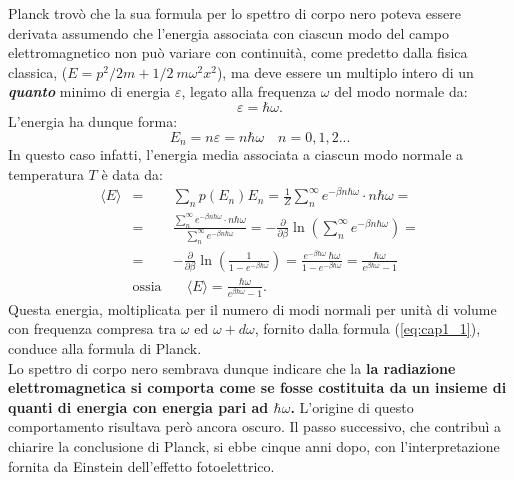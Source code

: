 \documentclass[a4paper,12pt,oneside]{book}
\begin{document}
Planck trovò che la sua formula  per lo spettro di corpo nero poteva essere derivata assumendo che l'energia associata con ciascun modo del campo elettromagnetico non può variare con continuità, come predetto dalla fisica classica, ($E= p^2/2m +1/2 \ m \omega ^2 x^2$), ma deve essere un multiplo intero di un \textbf{\textit{quanto}} minimo di energia $\varepsilon$, legato alla frequenza $\omega$ del modo normale da:
\begin{equation}
\varepsilon = \hbar \omega .
\end{equation}
L'energia ha dunque forma:
\begin{equation}
E_n = n\varepsilon = n \hbar \omega \quad n= 0,1,2...
\end{equation}
In questo caso infatti, l'energia media associata a ciascun modo normale a temperatura $T$ è data da:
\begin{eqnarray}
\langle E \rangle &=&\sum _n p(E_n) E_n =\frac{1}{Z}\sum _n ^{\infty} e^{-\beta n \hbar \omega} \cdot n\hbar \omega = \nonumber \\
&=&\frac{\sum _n ^{\infty} e^{-\beta n \hbar \omega} \cdot n\hbar \omega}{\sum _n ^{\infty} e^{-\beta n \hbar \omega}}= - \frac{\partial}{\partial \beta} \ln \left( \sum _n ^{\infty} e^{-\beta n \hbar \omega}\right)= \nonumber \\
&=&- \frac{\partial}{\partial \beta} \ln \left( \frac{1}{1- e^{-\beta \hbar \omega}}\right)=  \frac{e^{-\beta \hbar \omega}\ \hbar \omega}{1-e^{-\beta \hbar \omega}}= \frac{ \hbar \omega}{e^{\beta \hbar \omega}-1}\nonumber \\
&\textrm{ossia}& \quad \langle E \rangle = \frac{ \hbar \omega}{e^{\beta \hbar \omega}-1}.
\end{eqnarray}
Questa energia, moltiplicata per il numero di modi normali per unità di volume con frequenza compresa tra $\omega$ ed $\omega + d\omega$, fornito dalla formula (\ref{eq:cap1_1}), conduce alla formula di Planck.\\
Lo spettro di corpo nero sembrava dunque indicare che la \textbf{la radiazione elettromagnetica si comporta come se fosse costituita da un insieme di quanti di energia con energia pari ad $\hbar \omega $.}
L'origine di questo comportamento risultava però ancora oscuro. Il passo successivo, che contribuì a chiarire la conclusione di Planck, si ebbe cinque anni dopo, con l'interpretazione fornita da Einstein dell'effetto fotoelettrico.
\end{document}
